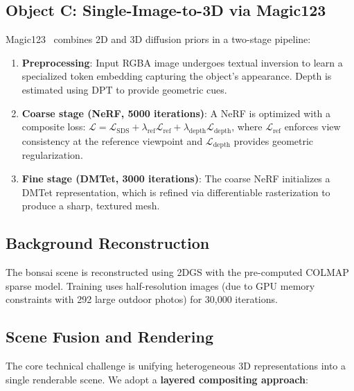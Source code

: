 \documentclass{article}
\begin{document}
\subsection{Object C: Single-Image-to-3D via Magic123}
\label{sec:object_c}

Magic123~\cite{qian2023magic123} combines 2D and 3D diffusion priors in a
two-stage pipeline:

\begin{enumerate}[leftmargin=*]
    \item \textbf{Preprocessing}: Input RGBA image undergoes textual inversion to
    learn a specialized token embedding capturing the object's appearance.
    Depth is estimated using DPT to provide geometric cues.
    \item \textbf{Coarse stage (NeRF, 5000 iterations)}: A NeRF is optimized with
    a composite loss:
    $\mathcal{L} = \mathcal{L}_{\text{SDS}} + \lambda_{\text{ref}}\mathcal{L}_{\text{ref}}
    + \lambda_{\text{depth}}\mathcal{L}_{\text{depth}}$, where $\mathcal{L}_{\text{ref}}$
    enforces view consistency at the reference viewpoint and $\mathcal{L}_{\text{depth}}$
    provides geometric regularization.
    \item \textbf{Fine stage (DMTet, 3000 iterations)}: The coarse NeRF initializes
    a DMTet representation, which is refined via differentiable rasterization
    to produce a sharp, textured mesh.
\end{enumerate}

\subsection{Background Reconstruction}

The bonsai scene is reconstructed using 2DGS with the pre-computed COLMAP
sparse model. Training uses half-resolution images (due to GPU memory constraints
with 292 large outdoor photos) for 30,000 iterations.

\subsection{Scene Fusion and Rendering}
\label{sec:fusion}

The core technical challenge is unifying heterogeneous 3D representations
into a single renderable scene. We adopt a \textbf{layered compositing approach}:
\end{document}

